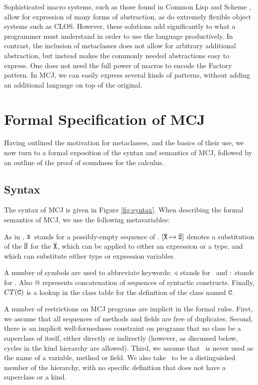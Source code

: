 \documentclass[nocopyrightspace,10pt]{acm-sigplan}
\begin{document}
Sophisticated macro systems, such as those found in Common Lisp
\cite{steele-90} and Scheme \cite{SyntaxCase}, allow for expression of
many forms of abstraction, as do extremely flexible object systems
such as CLOS. However, these solutions add significantly to what a
programmer must understand in order to use the language productively.
In contrast, the inclusion of metaclasses does not allow for arbitrary
additional abstraction, but instead makes the commonly needed
abstractions easy to express.  One does not need the full power of
macros to encode the Factory pattern.  In MCJ, we can easily express
several kinds of patterns, without adding an additional language on
top of the original.


\section{Formal Specification of MCJ}

\label{formal}

Having outlined the motivation for metaclasses, and the basics of
their use, we now turn to a formal exposition of the syntax and
semantics of MCJ, followed by an outline of the proof of soundness for
the calculus.


\subsection{Syntax}
\label{Syntax}

\figSyntax

The syntax of MCJ is given in Figure \ref{fig:syntax}. When describing
the formal semantics of MCJ, we use the following metavariables:

\metavars

As in \FJ, ${\overline{{\mbox {\tt x}}}}$\ stands for a possibly-empty
sequence of \x.  $[{\overline {\mbox {\tt X}}} \mapsto {\overline {\mbox {\tt S}}}]$ denotes a substitution of the ${\overline{{\mbox {\tt S}}}}$ for the
${\overline{{\mbox {\tt X}}}}$, which can be applied to either an expression or a type, and
which can substitute either type or expression variables.

A number of symbols are used to abbreviate keywords: $\triangleleft$
stands for \extends\ and $:$ stands for \kind. Also
$@$ represents concatenation of sequences of syntactic constructs.
Finally, $CT(\mathtt{{C}})$ is a lookup in the class table for the definition of
the class named $\mathtt{{C}}$.

A number of restrictions on MCJ programs are implicit in the formal
rules.  First, we assume that all sequences of methods and fields are
free of duplicates.  Second, there is an implicit well-formedness
constraint on programs that no class be a superclass of itself, either
directly or indirectly (however, as discussed below, cycles in the
kind hierarchy are allowed).  Third, we assume that \this\ is
never used as the name of a variable, method or field.  We also take
\Object\ to be a distinguished member of the hierarchy, with no
specific definition that does not have a superclass or a kind.
\end{document}
